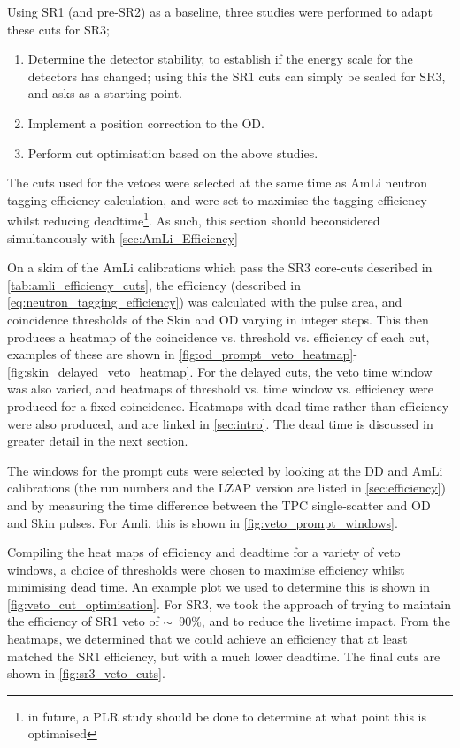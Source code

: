 Using SR1 (and pre-SR2) as a baseline, three studies were performed to adapt these cuts for SR3;
\begin{enumerate}
    \item Determine the detector stability, to establish if the energy scale for the detectors has changed; using this the SR1 cuts can simply be scaled for SR3, and asks as a starting point.
    \item Implement a position correction to the OD.
    \item Perform cut optimisation based on the above studies.
\end{enumerate}

The cuts used for the vetoes were selected at the same time as AmLi neutron tagging efficiency calculation, and were set to maximise the tagging efficiency whilst reducing deadtime\footnote{in future, a PLR study should be done to determine at what point this is optimaised}.
As such, this section should beconsidered simultaneously with \autoref{sec:AmLi_Efficiency}

On a skim of the AmLi calibrations which pass the SR3 core-cuts described in \autoref{tab:amli_efficiency_cuts}, the efficiency (described in \autoref{eq:neutron_tagging_efficiency}) was calculated with the pulse area, and coincidence thresholds of the Skin and OD varying in integer steps.
This then produces a heatmap of the coincidence vs. threshold vs. efficiency of each cut, examples of these are shown in \autoref{fig:od_prompt_veto_heatmap}-\ref{fig:skin_delayed_veto_heatmap}. 
For the delayed cuts, the veto time window was also varied, and heatmaps of threshold vs. time window vs. efficiency were produced for a fixed coincidence.
Heatmaps with dead time rather than efficiency were also produced, and are linked in \autoref{sec:intro}.
The dead time is discussed in greater detail in the next section. 

The windows for the prompt cuts were selected by looking at the DD and AmLi calibrations (the run numbers and the LZAP version are listed in \autoref{sec:efficiency}) and by measuring the time difference between the TPC single-scatter and OD and Skin pulses.
For Amli, this is shown in \autoref{fig:veto_prompt_windows}.

Compiling the heat maps of efficiency and deadtime for a variety of veto windows, a choice of thresholds were chosen to maximise efficiency whilst minimising dead time.
An example plot we used to determine this is shown in \autoref{fig:veto_cut_optimisation}.
For SR3, we took the approach of trying to maintain the efficiency of SR1 veto of $\sim$~90\%, and to reduce the livetime impact.
From the heatmaps, we determined that we could achieve an efficiency that at least matched the SR1 efficiency, but with a much lower deadtime.
The final cuts are shown in \autoref{fig:sr3_veto_cuts}.



